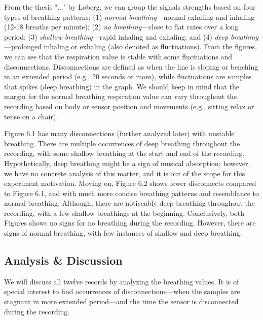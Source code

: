 From the thesis "..." by Løberg, we can group the signals strengths based on four types of breathing patterns: (1) \textit{normal breathing}---normal exhaling and inhaling (12-18 breaths per minute); (2) \textit{no breathing}---close to flat rates over a long period; (3) \textit{shallow breathing}---rapid inhaling and exhaling; and (4) \textit{deep breathing}---prolonged inhaling or exhaling (also denoted as fluctuations). From the figures, we can see that the respiration value is stable with some fluctuations and disconnections. Disconnections are defined as when the line is sloping or benching in an extended period (e.g., 20 seconds or more), while fluctuations are samples that spikes (deep breathing) in the graph. We should keep in mind that the margin for the normal breathing respiration value can vary throughout the recording based on body or sensor position and movements (e.g., sitting relax or tense on a chair). 

Figure 6.1 has many disconnections (further analyzed later) with unstable breathing. There are multiple occurrences of deep breathing throughout the recording, with some shallow breathing at the start and end of the recording. Hypothetically, deep breathing might be a sign of musical absorption; however, we have no concrete analysis of this matter, and it is out of the scope for this experiment motivation. Moving on, Figure 6.2 shows fewer disconnects compared to Figure 6.1, and with much more concise breathing patterns and resemblance to normal breathing. Although, there are noticeably deep breathing throughout the recording, with a few shallow breathings at the beginning. Conclusively, both Figures shows no signs for no breathing during the recording. However, there are signs of normal breathing, with few instances of shallow and deep breathing. 

\subsection{Analysis \& Discussion}
We will discuss all twelve records by analyzing the breathing values. It is of special interest to find occurrences of disconnections---when the samples are stagnant in more extended period---and the time the sensor is disconnected during the recording.

